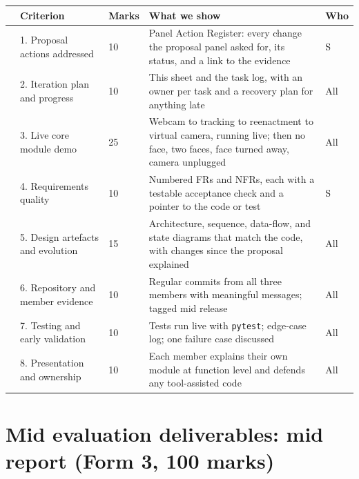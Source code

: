 \documentclass[10pt,a4paper]{article}
\newcounter{cbn}
\newcommand{\cb}{\mbox{\stepcounter{cbn}\CheckBox[name=cb\thecbn,width=9pt,height=9pt,borderwidth=0.8pt,bordercolor=0 0 0,backgroundcolor=1 1 1,checkboxsymbol=\ding{51}]{}}}
\begin{document}
\begin{Form}
\begin{longtable}{@{}p{6mm}p{44mm}p{11mm}p{90mm}p{9mm}@{}}
\toprule
 & Criterion & Marks & What we show & Who \\
\midrule
\endhead
\cb & 1. Proposal actions addressed & 10 & Panel Action Register: every change the proposal panel asked for, its status, and a link to the evidence & S \\
\cb & 2. Iteration plan and progress & 10 & This sheet and the task log, with an owner per task and a recovery plan for anything late & All \\
\cb & 3. Live core module demo & 25 & Webcam to tracking to reenactment to virtual camera, running live; then no face, two faces, face turned away, camera unplugged & All \\
\cb & 4. Requirements quality & 10 & Numbered FRs and NFRs, each with a testable acceptance check and a pointer to the code or test & S \\
\cb & 5. Design artefacts and evolution & 15 & Architecture, sequence, data-flow, and state diagrams that match the code, with changes since the proposal explained & All \\
\cb & 6. Repository and member evidence & 10 & Regular commits from all three members with meaningful messages; tagged mid release & All \\
\cb & 7. Testing and early validation & 10 & Tests run live with \texttt{pytest}; edge-case log; one failure case discussed & All \\
\cb & 8. Presentation and ownership & 10 & Each member explains their own module at function level and defends any tool-assisted code & All \\
\bottomrule
\end{longtable}

\section*{Mid evaluation deliverables: mid report (Form 3, 100 marks)}


\end{Form}
\end{document}
